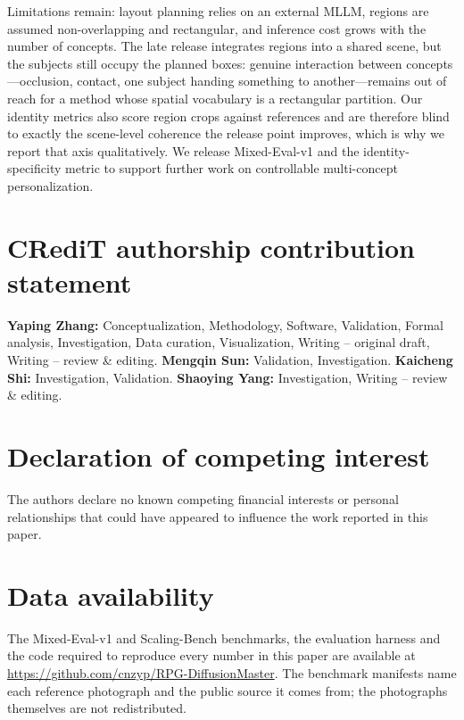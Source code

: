 \documentclass[review,10pt,times]{elsarticle}
\begin{document}
Limitations remain: layout planning relies on an external MLLM,
regions are assumed non-overlapping and rectangular, and inference cost
grows with the number of concepts.  The late release integrates regions
into a shared scene, but the subjects still occupy the planned boxes:
genuine interaction between concepts---occlusion, contact, one subject
handing something to another---remains out of reach for a method whose
spatial vocabulary is a rectangular partition.  Our identity metrics
also score region crops against references and are therefore blind to
exactly the scene-level coherence the release point improves, which is
why we report that axis qualitatively.  We release Mixed-Eval-v1 and
the identity-specificity metric to support further work on controllable
multi-concept personalization.

\section*{CRediT authorship contribution statement}
\textbf{Yaping Zhang:} Conceptualization, Methodology, Software, Validation,
Formal analysis, Investigation, Data curation, Visualization, Writing --
original draft, Writing -- review \& editing.
\textbf{Mengqin Sun:} Validation, Investigation.
\textbf{Kaicheng Shi:} Investigation, Validation.
\textbf{Shaoying Yang:} Investigation, Writing -- review \& editing.

\section*{Declaration of competing interest}
The authors declare no known competing financial interests or personal
relationships that could have appeared to influence the work reported in this
paper.

\section*{Data availability}
The Mixed-Eval-v1 and Scaling-Bench benchmarks, the evaluation harness and
the code required to reproduce every number in this paper are available at
\url{https://github.com/cnzyp/RPG-DiffusionMaster}.  The benchmark manifests
name each reference photograph and the public source it comes from; the
photographs themselves are not redistributed.
\end{document}
